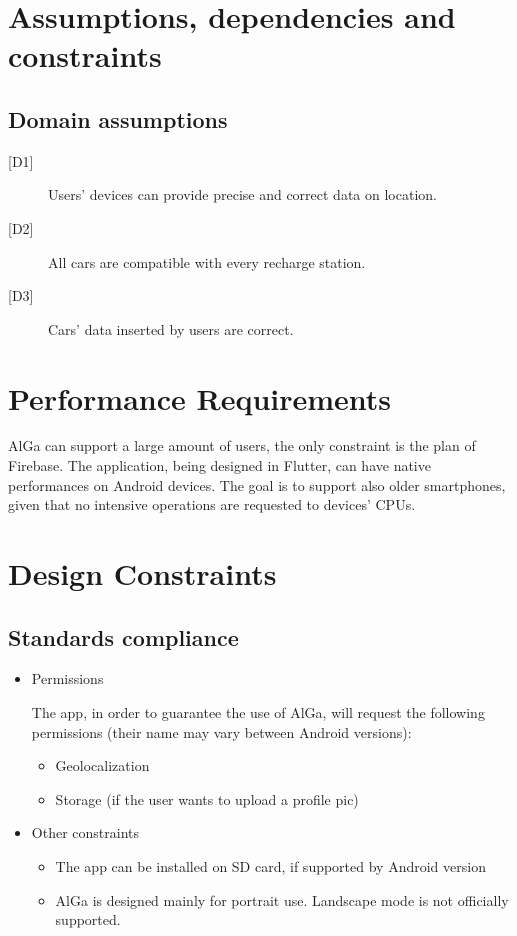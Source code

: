 \section{Assumptions, dependencies and constraints}
\subsection*{Domain assumptions}
\begin{description}
    \item[{[D1]}] Users’ devices can provide precise and correct data on location.
    \item[{[D2]}] All cars are compatible with every recharge station.
    \item[{[D3]}] Cars' data inserted by users are correct.
\end{description}

\section{Performance Requirements}
AlGa can support a large amount of users, the only constraint is the plan of Firebase. 
The application, being designed in Flutter, can have native performances on Android devices. The goal is to support also older smartphones, given that no intensive operations are requested to devices' CPUs.

\section{Design Constraints}
\subsection{Standards compliance}
\begin{itemize}
    \item Permissions
    
	The app, in order to guarantee the use of AlGa, will request the following permissions (their name may vary between Android versions):
	\begin{itemize}
	    \item Geolocalization
	    \item Storage (if the user wants to upload a profile pic)
	\end{itemize}
    \item Other constraints
	\begin{itemize}
	    \item The app can be installed on SD card, if supported by Android version
	    \item AlGa is designed mainly for portrait use. Landscape mode is not officially supported.
	\end{itemize}
\end{itemize}

